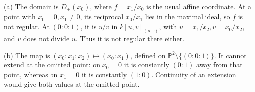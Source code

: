 (a) The domain is $D_+(x_0)$, where $f=x_1/x_0$ is the usual affine coordinate. At a point with $x_0=0,x_1\ne0$, its reciprocal $x_0/x_1$ lies in the maximal ideal, so $f$ is not regular. At $(0:0:1)$, it is $u/v$ in $k[u,v]_{(u,v)}$, with $u=x_1/x_2,v=x_0/x_2$, and $v$ does not divide $u$. Thus it is not regular there either.

(b) The map is $(x_0:x_1:x_2)\mapsto(x_0:x_1)$, defined on $\mathbb P^2\setminus\{(0:0:1)\}$. It cannot extend at the omitted point: on $x_0=0$ it is constantly $(0:1)$ away from that point, whereas on $x_1=0$ it is constantly $(1:0)$. Continuity of an extension would give both values at the omitted point.
